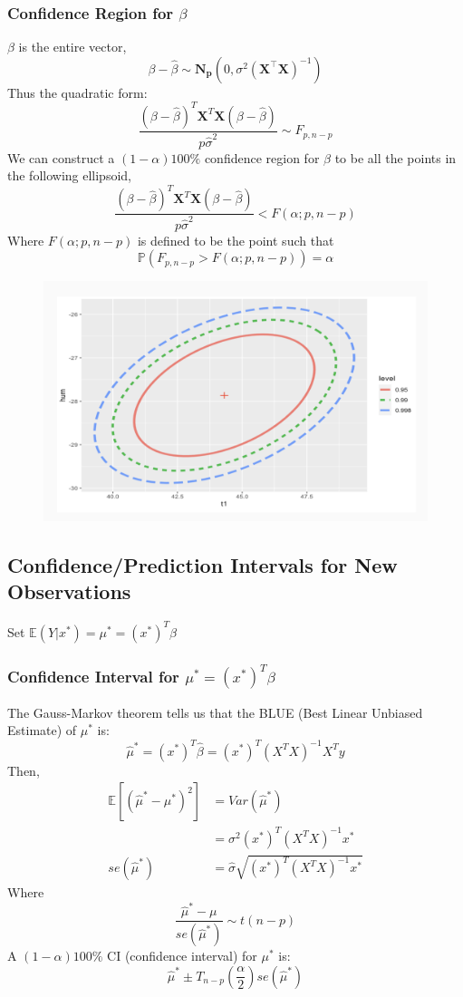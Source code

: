 \documentclass[11pt,a4paper]{article}
\begin{document}
\subsubsection{Confidence Region for $\beta$}
$\beta$ is the entire vector,
$$\beta-\hat{\beta}\sim\mathbf{N}_{\mathbf{p}}\left(0, \sigma^{2}\left(\mathbf{X}^{\top} \mathbf{X}\right)^{-1}\right)$$
Thus the quadratic form:
$$\frac{(\beta-\hat{\beta})^T \mathbf{X}^T \mathbf{X}(\beta-\hat{\beta})}{p \hat{\sigma}^2}\sim F_{p,n-p}$$
We can construct a $(1-\alpha)100\%$ conﬁdence region for $\beta$ to be all the points in the following ellipsoid,
$$\frac{(\beta-\hat{\beta})^T \mathbf{X}^T \mathbf{X}(\beta-\hat{\beta})}{p \hat{\sigma}^2}<F(\alpha; p,n-p)$$
Where $F(\alpha; p,n-p)$ is defined to be the point such that $$\mathbb{P}(F_{p,n-p}>F(\alpha; p,n-p))=\alpha$$
\begin{center}\begin{figure}[htbp]
    \centering
    \includegraphics[scale=0.5]{Lec0701.png}
    \caption{}
    \label{}
\end{figure}\end{center}

\subsection{Conﬁdence/Prediction Intervals for New Observations}
Set $\mathbb{E}(Y|x^*)=\mu^*=(x^*)^T\beta$
\subsubsection{Confidence Interval for $\mu^*=(x^*)^T\beta$}
The Gauss-Markov theorem tells us that the BLUE (Best Linear Unbiased Estimate) of $\mu^*$ is:
$$\hat{\mu}^*=(x^*)^T \hat{\beta}=(x^*)^T(X^TX)^{-1}X^Ty$$
Then,
\begin{equation}
    \begin{aligned}
        \mathbb{E}[(\hat{\mu}^*-\mu^*)^2]&=Var(\hat{\mu}^*)\\
        &=\sigma^2(x^*)^T(X^TX)^{-1}x^*\\
        se(\hat{\mu}^*)&=\hat{\sigma}\sqrt{(x^*)^T(X^TX)^{-1}x^*}
    \end{aligned}
    \nonumber
\end{equation}
Where $$\frac{\hat{\mu}^*-\mu}{se(\hat{\mu}^*)} \sim t(n-p)$$
A $(1-\alpha)100\%$ CI (confidence interval) for $\mu^*$ is:
$$\hat{\mu}^*\pm T_{n-p}(\frac{\alpha}{2})se(\hat{\mu}^*)$$
\end{document}

